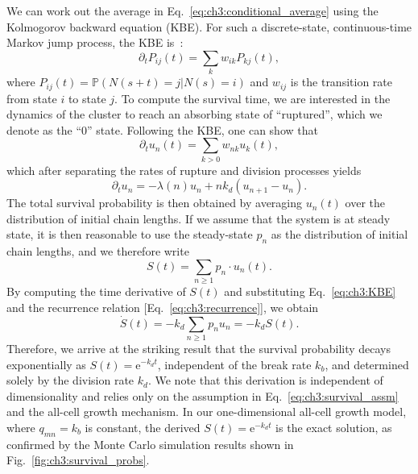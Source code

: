 We can work out the average in Eq.~\eqref{eq:ch3:conditional_average} using the Kolmogorov backward equation (KBE). For such a discrete-state, continuous-time Markov jump process, the KBE is~\cite{ross1995stochastic,norris1997markov}:
\begin{equation}
    \partial_tP_{ij}(t)=\sum_k w_{ik} P_{kj}(t),
\end{equation}
where $P_{ij}(t)=\mathbb{P}(N(s+t)=j|N(s)=i)$ and $w_{ij}$ is the transition rate from state $i$ to state $j$. To compute the survival time, we are interested in the dynamics of the cluster to reach an absorbing state of ``ruptured'', which we denote as the ``0'' state. Following the KBE, one can show that
\begin{equation}\label{eq:ch3:KBE}
    \partial_t u_n(t)=\sum_{k> 0} w_{nk}u_k(t),
\end{equation}
which after separating the rates of rupture and division processes yields
\begin{equation}
    \partial_t u_n =-\lambda(n) u_n + n k_d (u_{n+1} - u_n).
\end{equation}
The total survival probability is then obtained by averaging $u_n(t)$ over the distribution of initial chain lengths. If we assume that the system is at steady state, it is then reasonable to use the steady-state $p_n$ as the distribution of initial chain lengths, and we therefore write
\begin{equation}
    S(t)=\sum_{n\geqslant 1} p_{n}\cdot u_n(t).
\end{equation}
By computing the time derivative of $S(t)$ and substituting Eq.~\eqref{eq:ch3:KBE} and the recurrence relation [Eq.~\eqref{eq:ch3:recurrence}], we obtain
\begin{equation}
    \dot{S}(t)=-k_d\sum_{n\geqslant 1} p_n u_n =-k_d S(t).
\end{equation}
Therefore, we arrive at the striking result that the survival probability decays exponentially as $S(t)=\mathrm{e}^{-k_d t}$, independent of the break rate $k_b$, and determined solely by the division rate $k_d$. We note that this derivation is independent of dimensionality and relies only on the assumption in Eq.~\eqref{eq:ch3:survival_assm} and the all-cell growth mechanism. In our one-dimensional all-cell growth model, where $q_{mn}=k_b$ is constant, the derived $S(t)=\mathrm{e}^{-k_d t}$ is the exact solution, as confirmed by the Monte Carlo simulation results shown in Fig.~\ref{fig:ch3:survival_probs}.

